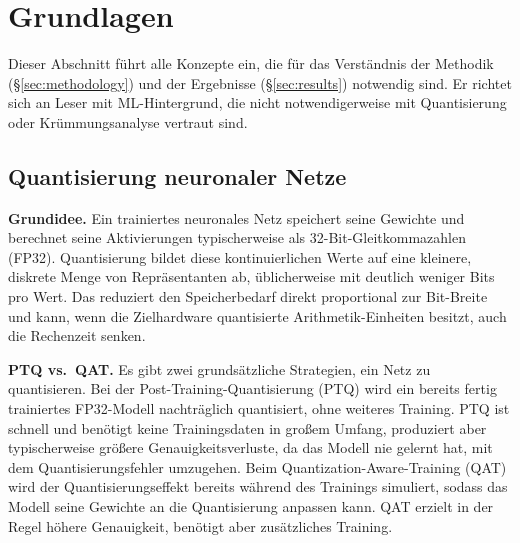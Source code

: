 \section{Grundlagen}
\label{sec:fundamentals}

Dieser Abschnitt führt alle Konzepte ein, die für das Verständnis der Methodik (\S\ref{sec:methodology}) und der Ergebnisse (\S\ref{sec:results}) notwendig sind. Er richtet sich an Leser mit ML-Hintergrund, die nicht notwendigerweise mit Quantisierung oder Krümmungsanalyse vertraut sind.

\subsection{Quantisierung neuronaler Netze}
\label{sec:fund-quant}

\textbf{Grundidee.} Ein trainiertes neuronales Netz speichert seine Gewichte und berechnet seine Aktivierungen typischerweise als 32-Bit-Gleitkommazahlen (FP32). Quantisierung bildet diese kontinuierlichen Werte auf eine kleinere, diskrete Menge von Repräsentanten ab, üblicherweise mit deutlich weniger Bits pro Wert. Das reduziert den Speicherbedarf direkt proportional zur Bit-Breite und kann, wenn die Zielhardware quantisierte Arithmetik-Einheiten besitzt, auch die Rechenzeit senken.
\par\medskip

\textbf{PTQ vs.\ QAT.} Es gibt zwei grundsätzliche Strategien, ein Netz zu quantisieren. Bei der Post-Training-Quantisierung (PTQ) wird ein bereits fertig trainiertes FP32-Modell nachträglich quantisiert, ohne weiteres Training. PTQ ist schnell und benötigt keine Trainingsdaten in großem Umfang, produziert aber typischerweise größere Genauigkeitsverluste, da das Modell nie gelernt hat, mit dem Quantisierungsfehler umzugehen. Beim Quantization-Aware-Training (QAT) wird der Quantisierungseffekt bereits während des Trainings simuliert, sodass das Modell seine Gewichte an die Quantisierung anpassen kann. QAT erzielt in der Regel höhere Genauigkeit, benötigt aber zusätzliches Training.
\par\medskip

